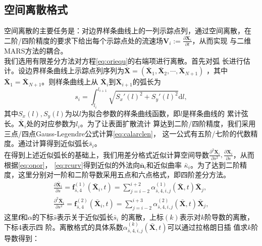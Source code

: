 \documentclass[a4paper,twoside]{ctexart}
\newcommand{\pdfrac}[2]{\frac{\partial #1}{\partial #2}}
\begin{document}
\subsection{空间离散格式}
\label{sec:discrete}
空间离散的主要任务是：对边界样条曲线上的一列示踪点列，通过空间离散，在
二阶/四阶精度的要求下给出每个示踪点处的流速场$\boldsymbol V_i := \pdfrac{\boldsymbol X_i}{t}$，从而实现
与二维MARS方法的耦合。\\
\indent 我们选用有限差分方法对方程\eqref{eq:oriequ}的右端项进行离散。首先对弧
长进行估计。设边界样条曲线上示踪点列序列为$\bar{\boldsymbol X} =
\left(\bar{\boldsymbol X}_1,\bar{\boldsymbol X}_2,\cdots,\bar{\boldsymbol X}_{N+1}\right)$
，其中$\bar{\boldsymbol X}_1 = \bar{\boldsymbol X}_{N+1}$。则样条曲线上从
$\bar{\boldsymbol X}_i$到$\bar{\boldsymbol X}_{i+1}$的弧长为
\begin{equation}
  \label{eq:calarclen}
  s_i = \int_{l_i}^{l_{i+1}}\sqrt{S_x'(l)^2 + S_y'(l)^2}\text{d}l, 
\end{equation}
其中$S_x(l),S_y(l)$为以$l$为拟合参数的样条曲线函数，即$l$是样条曲线的
累计弦长。$\bar{\boldsymbol X}_i$处的对应参数为$l_i$。为了让表面扩散流计
算达到二阶/四阶精度，我们采用三点/四点Gauss-Legendre公式计算\eqref{eq:calarclen}，
这一公式有五阶/七阶的代数精度。通过计算得到近似弧长$\bar{s}_i$。\\
\indent 在得到上述近似弧长的基础上，我们用差分格式近似计算空间导数$\frac{\partial^2\boldsymbol X_i}{\partial
    s^2},\pdfrac{\boldsymbol X_i}{s}$，从而根据\eqref{eq:onor}，
  \eqref{eq:rcurv}得到近似的外法向$\bar{\boldsymbol n}_i$和近似曲率
  $\bar{\kappa}_i$。为了达到二阶精度，这里分别对一阶和二阶导数采用五点和六点格式，即四阶差分方法。
  \begin{eqnarray}    
    \pdfrac{\bar{\boldsymbol X}_i}{s} =
    \boldsymbol f_{\bar{s},4}^{(1)}(\bar{\boldsymbol X}_i,t) =
    \sum_{j=i-2}^{i+2}\alpha_{\bar{s},4,i,j}^{(1)}(\bar{\boldsymbol X},t)
    \bar{\boldsymbol X}_j,
    \label{eq:calder1}\\
    \frac{\partial^2\bar{\boldsymbol X}_i}{\partial s^2} =
    \boldsymbol f_{\bar{s},4}^{(2)}(\bar{\boldsymbol X}_i,t) =
    \sum_{j=i-2}^{i+3}\alpha_{\bar{s},4,i,j}^{(2)}(\bar{\boldsymbol X},t)
    \bar{\boldsymbol X}_j,
    \label{eq:calder2}
  \end{eqnarray}
  这里$\boldsymbol f$和$\alpha$的下标$\bar{s}$表示关于近似弧长$\bar{s}_i$
  的离散，上标$(k)$表示对$k$阶导数的离散，下标$4$表示四
  阶。离散格式的具体系数$\alpha_{\bar{s},4,i,j}^{(k)}(\bar{\boldsymbol X},t)$可以通过拉格朗日插
  值求$k$阶导数得到：
  
\end{document}
